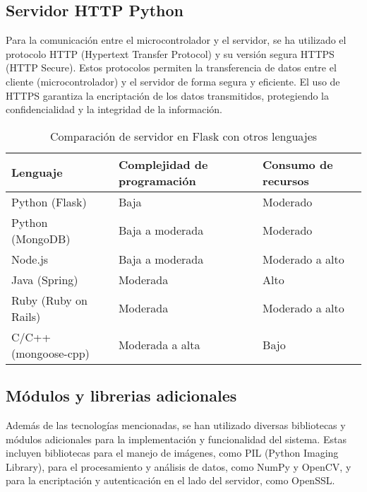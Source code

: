 \subsection{Servidor HTTP Python}
Para la comunicación entre el microcontrolador y el servidor, se ha utilizado el protocolo HTTP (Hypertext Transfer Protocol) y su versión segura HTTPS (HTTP Secure). Estos protocolos permiten la transferencia de datos entre el cliente (microcontrolador) y el servidor de forma segura y eficiente. El uso de HTTPS garantiza la encriptación de los datos transmitidos, protegiendo la confidencialidad y la integridad de la información.


\begin{table}[h]
\centering
\caption{Comparación de servidor en Flask con otros lenguajes}
\label{tabla:comparacion-servidor}
\begin{tabular}{|l|l|l|}
\hline
\textbf{Lenguaje}    & \textbf{Complejidad de programación} & \textbf{Consumo de recursos}  \\ \hline
Python (Flask)       & Baja                                 & Moderado                      \\ \hline
Python (MongoDB)     & Baja a moderada                      & Moderado                      \\ \hline
Node.js              & Baja a moderada                      & Moderado a alto               \\ \hline
Java (Spring)        & Moderada                             & Alto                          \\ \hline
Ruby (Ruby on Rails) & Moderada                             & Moderado a alto               \\ \hline
C/C++ (mongoose-cpp) & Moderada a alta                      & Bajo                          \\ \hline
\end{tabular}
\end{table}


\subsection{Módulos y librerias adicionales}
Además de las tecnologías mencionadas, se han utilizado diversas bibliotecas y módulos adicionales para la implementación y funcionalidad del sistema. Estas incluyen bibliotecas para el manejo de imágenes, como PIL (Python Imaging Library), para el procesamiento y análisis de datos, como NumPy y OpenCV, y para la encriptación y autenticación en el lado del servidor, como OpenSSL.

